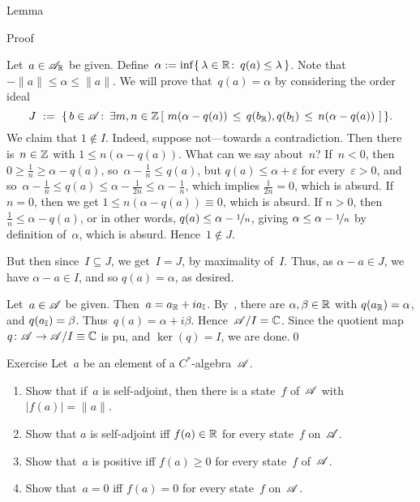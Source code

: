 \documentclass[a]{subfiles}
\begin{document}
\begin{parsec}
\begin{point}{Lemma}
\begin{point}{Proof}
\begin{point}%
Let~$a\in \mathscr{A}_{\mathbb{R}}$ be given.
Define~$\alpha := \inf\{\,\lambda\in\mathbb{R}\colon\, q(a)\leq \lambda\,\}$.
Note that $-\|a\| \leq \alpha\leq \|a\|$.
We will prove that~$q(a)=\alpha$
by considering the order ideal
\begin{equation*}
J\ := \ \{\,b\in \scrA\colon\, \exists m,n\in \Z\,[\ 
m(\alpha-q(a)) \,\leq\, q(\Real{b}),q(\Imag{b})\,\leq\, n(\alpha-q(a))\ ]\,\}.
\end{equation*}
We claim that $1\notin I$.
Indeed, suppose not---towards a contradiction.
Then there is~$n\in \mathbb{Z}$
with $1\leq n(\alpha-q(a))$.
What can we say about~$n$?
If~$n<0$,
then $0\geq \frac{1}{n}\geq \alpha-q(a)$,
so~$\alpha-\frac{1}{n} \leq q(a)$,
but $q(a)\leq \alpha+\varepsilon$
for every~$\varepsilon>0$,
and so~$\alpha-\frac{1}{n}\leq q(a)\leq \alpha-\frac{1}{2n}
\leq \alpha-\frac{1}{n}$,
which implies $\frac{1}{2n}=0$,
which is absurd.
If $n=0$,
then we get $1\leq n(\alpha-q(a))\equiv 0$, which is absurd.
If $n> 0$,
then $\frac{1}{n}\leq \alpha-q(a)$,
or in other words,
 $q(a) \leq \alpha - \nicefrac{1}{n}$,
giving $\alpha \leq \alpha-\nicefrac{1}{n}$
by definition of~$\alpha$,
which is absurd.
Hence~$1\notin J$.

But then since~$I\subseteq J$,
we get~$I=J$, by maximality of~$I$.
Thus, as $\alpha-a\in J$, we have $\alpha-a\in I$,
and so $q(a)=\alpha$, as desired.
\end{point}
\begin{point}%
Let~$a\in \mathscr{A}$ be given.
Then~$a=a_{\mathbb{R}}+ia_{\mathbb{I}}$.
By~,
there are $\alpha,\beta\in \mathbb{R}$ with $q(a_{\mathbb{R}})=\alpha$,
and $q(a_{\mathbb{I}})=\beta$.
Thus~$q(a)=\alpha+i\beta$.
Hence~$\mathscr{A}/I=\mathbb{C}$.
Since the quotient map $q\colon \mathscr{A}\to \mathscr{A}/I\equiv \mathbb{C}$
is pu, and $\ker(q)=I$, we are done.\qed
\end{point}
\end{point}
\begin{point}[separation-by-states]{Exercise}%
Let~$a$ be an element of a $C^*$-algebra~$\mathscr{A}$.
\begin{enumerate}
\item
Show that if~$a$ is self-adjoint, then 
there is a state~$f$ of~$\mathscr{A}$ with $\left|f(a)\right|=\|a\|$.
\item
Show that $a$ is self-adjoint iff $f(a)\in \mathbb{R}$ for every state~$f$ on~$\mathscr{A}$.
\item
Show that~$a$ is positive iff $f(a)\geq 0$ for every state~$f$ of~$\mathscr{A}$.
\item
Show that~$a=0$ iff $f(a)=0$ for every state~$f$ on~$\mathscr{A}$.
\end{enumerate}
\end{point}
\end{point}
\end{parsec}
\end{document}
